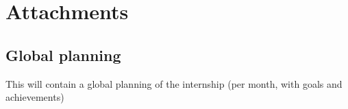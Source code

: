 \section{Attachments}
\label{sec:attach}

\subsection{Global planning}
\label{ssec:planning}

This will contain a global planning of the internship (per month, with goals and achievements)
